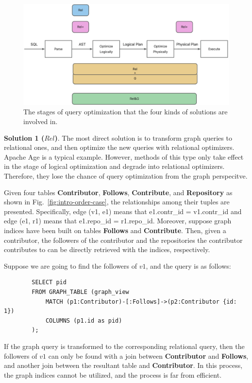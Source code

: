 \begin{figure}
    \centering
    \includegraphics[width=.6\linewidth]{./figures/catagory.png}
    \caption{The stages of query optimization that the four kinds of solutions are involved in.}
    \label{fig:catagory}
\end{figure}

\textbf{Solution 1 ($Rel$)}. 
The most direct solution is to transform graph queries to relational ones, and then optimize the new queries with relational optimizers.
Apache Age \cite{apache-age} is a typical example.
However, methods of this type only take effect in the stage of logical optimization and degrade into relational optimizers.
Therefore, they lose the chance of query optimization from the graph perspecitve.

\begin{example}
    Given four tables \textbf{Contributor}, \textbf{Follows}, \textbf{Contribute}, and \textbf{Repository} as shown in Fig.~\ref{fig:intro-order-case}, the relationships among their tuples are presented.
    Specifically, edge (v1, e1) means that e1.contr\_id = v1.contr\_id and edge (e1, r1) means that e1.repo\_id = r1.repo\_id.
    Moreover, suppose graph indices have been built on tables \textbf{Follows} and \textbf{Contribute}.
    Then, given a contributor, the followers of the contributor and the repositories the contributor contributes to can be directly retrieved with the indices, respectively.

    Suppose we are going to find the followers of $v1$, and the query is as follows:
    \begin{lstlisting}
        SELECT pid
        FROM GRAPH_TABLE (graph_view
            MATCH (p1:Contributor)-[:Follows]->(p2:Contributor {id: 1})
            COLUMNS (p1.id as pid)
        );
    \end{lstlisting}
    If the graph query is transformed to the corresponding relational query, then the followers of $v1$ can only be found with a join between \textbf{Contributor} and \textbf{Follows}, and another join between the resultant table and \textbf{Contributor}.
    In this process, the graph indices cannot be utilized, and the process is far from efficient.
\end{example}


